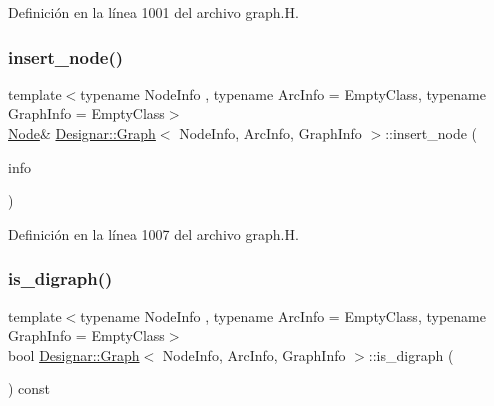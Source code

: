 Definición en la línea 1001 del archivo graph.\+H.

\mbox{\label{class_designar_1_1_graph_abbf6788c27f9719907d31fe7f7a83920}} 
\subsubsection{\texorpdfstring{insert\+\_\+node()}{insert\_node()}\hspace{0.1cm}{\footnotesize\ttfamily [4/4]}}
{\footnotesize\ttfamily template$<$typename Node\+Info , typename Arc\+Info  = Empty\+Class, typename Graph\+Info  = Empty\+Class$>$ \\
\hyperlink{class_designar_1_1_graph_a5dfc7dba9d092ac489c72e40390c37d0}{Node}\& \hyperlink{class_designar_1_1_graph}{Designar\+::\+Graph}$<$ Node\+Info, Arc\+Info, Graph\+Info $>$\+::insert\+\_\+node (\begin{DoxyParamCaption}\item[{Node\+Info \&\&}]{info }\end{DoxyParamCaption})\hspace{0.3cm}{\ttfamily [inline]}}



Definición en la línea 1007 del archivo graph.\+H.

\mbox{\label{class_designar_1_1_graph_af0e0b3d1d6a52e0f3d3225f1fa274211}} 
\subsubsection{\texorpdfstring{is\+\_\+digraph()}{is\_digraph()}}
{\footnotesize\ttfamily template$<$typename Node\+Info , typename Arc\+Info  = Empty\+Class, typename Graph\+Info  = Empty\+Class$>$ \\
bool \hyperlink{class_designar_1_1_graph}{Designar\+::\+Graph}$<$ Node\+Info, Arc\+Info, Graph\+Info $>$\+::is\+\_\+digraph (\begin{DoxyParamCaption}{ }\end{DoxyParamCaption}) const\hspace{0.3cm}{\ttfamily [inline]}}



